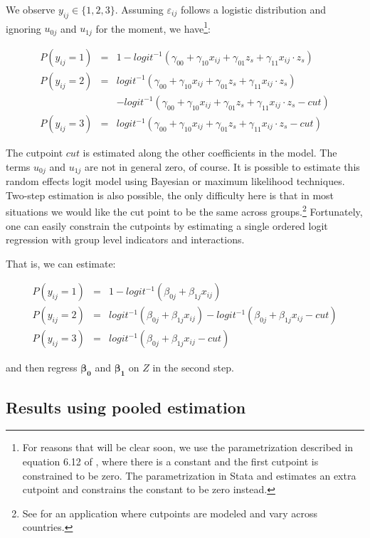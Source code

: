 We observe $y_{ij}\in \{1,2,3\}$. Assuming $\varepsilon_{ij}$ follows a logistic distribution and ignoring $u_{0j}$ and $u_{1j}$ for the moment, we have\footnote{For reasons that will be clear soon, we use the parametrization described in equation 6.12 of \citet{Gelman:2007}, where there is a constant and the first cutpoint is constrained to be zero. The parametrization in Stata and \citet{Venables:2002a} estimates an extra cutpoint and constrains the constant to be zero instead.}:

\begin{eqnarray}
P(y_{ij}=1) &=& 1-logit^{-1}(\gamma_{00}+\gamma_{10} x_{ij}+\gamma_{01} z_s+\gamma_{11} x_{ij}\cdot z_s) \\
P(y_{ij}=2) &=& logit^{-1}(\gamma_{00}+\gamma_{10} x_{ij}+\gamma_{01} z_s+\gamma_{11} x_{ij}\cdot z_s) \\ && -logit^{-1}(\gamma_{00}+\gamma_{10} x_{ij}+\gamma_{01} z_s+\gamma_{11} x_{ij}\cdot z_s - cut)\\
P(y_{ij}=3) &=& logit^{-1}(\gamma_{00}+\gamma_{10} x_{ij}+\gamma_{01} z_s+\gamma_{11} x_{ij}\cdot z_s - cut)
\end{eqnarray}

The cutpoint $cut$ is estimated along the other coefficients in the model. The terms $u_{0j}$ and $u_{1j}$ are not in general zero, of course. It is possible to estimate this random effects logit model using Bayesian or maximum likelihood techniques. Two-step estimation is also possible, the only difficulty here is that in most situations we would like the cut point to be the same across groups.\footnote{See \cite{king:2003b} for an application where cutpoints are modeled and vary across countries.} Fortunately, one can easily constrain the cutpoints by estimating a single ordered logit regression with group level indicators and interactions.

That is, we can estimate:

\begin{eqnarray}
P(y_{ij}=1) &=& 1-logit^{-1}(\beta_{0j}+\beta_{1j} x_{ij}) \\
P(y_{ij}=2) &=& logit^{-1}(\beta_{0j}+\beta_{1j} x_{ij}) - logit^{-1}(\beta_{0j}+\beta_{1j} x_{ij}-cut)\\
P(y_{ij}=3) &=& logit^{-1}(\beta_{0j}+\beta_{1j} x_{ij}-cut)
\end{eqnarray}

and then regress $\mathbf{\beta_{0}}$ and $\mathbf{\beta_{1}}$ on $Z$ in the second step.

\subsection{Results using pooled estimation}

